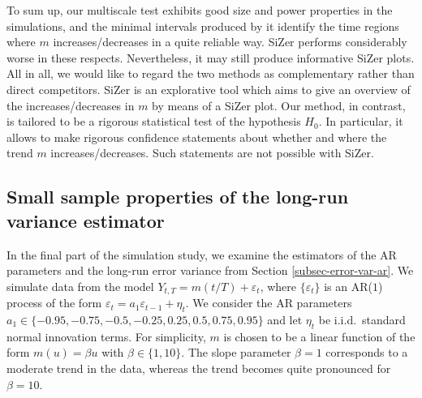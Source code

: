To sum up, our multiscale test exhibits good size and power properties in the simulations, and the minimal intervals produced by it identify the time regions where $m$ increases/decreases in a quite reliable way. SiZer performs considerably worse in these respects. Nevertheless, it may still produce informative SiZer plots. %
All in all, we would like to regard the two methods as complementary rather than direct competitors. SiZer is an explorative tool which aims to give an overview of the increases/decreases in $m$ by means of a SiZer plot. Our method, in contrast, is tailored to be a rigorous statistical test of the hypothesis $H_0$. In particular, it allows to make rigorous confidence statements about whether and where the trend $m$ increases/decreases. Such statements are not possible with SiZer. 


\subsection{Small sample properties of the long-run variance estimator}\label{subsec-sim-3}


In the final part of the simulation study, we examine the estimators of the AR parameters and the long-run error variance from Section \ref{subsec-error-var-ar}. We simulate data from the model $Y_{t,T} = m(t/T) + \varepsilon_t$, where $\{ \varepsilon_t\}$ is an AR($1$) process of the form $\varepsilon_t = a_1 \varepsilon_{t-1} + \eta_t$. We consider the AR parameters $a_1 \in \{-0.95,-0.75,-0.5,-0.25,0.25,0.5,0.75,0.95\}$ and let $\eta_t$ be i.i.d.\ standard normal innovation terms. For simplicity, $m$ is chosen to be a linear function of the form $m(u) = \beta u$ with $\beta \in \{1,10\}$. The slope parameter $\beta = 1$ corresponds to a moderate trend in the data, whereas the trend becomes quite pronounced for $\beta = 10$. 


